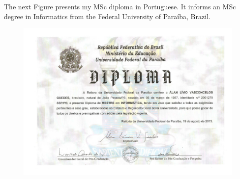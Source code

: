 \documentclass[10pt,a4paper,sans,colorlinks]{moderncv}
\begin{document}
The next Figure presents my MSc diploma in Portuguese.
It informs an MSc degree in Informatics from the Federal University of Paraíba, Brazil.

\begin{figure}
    \centering
    \includegraphics[align=t,width=\textwidth, keepaspectratio=true]{certificates/msc-diploma.pdf}
\end{figure}

\newpage
\end{document}
